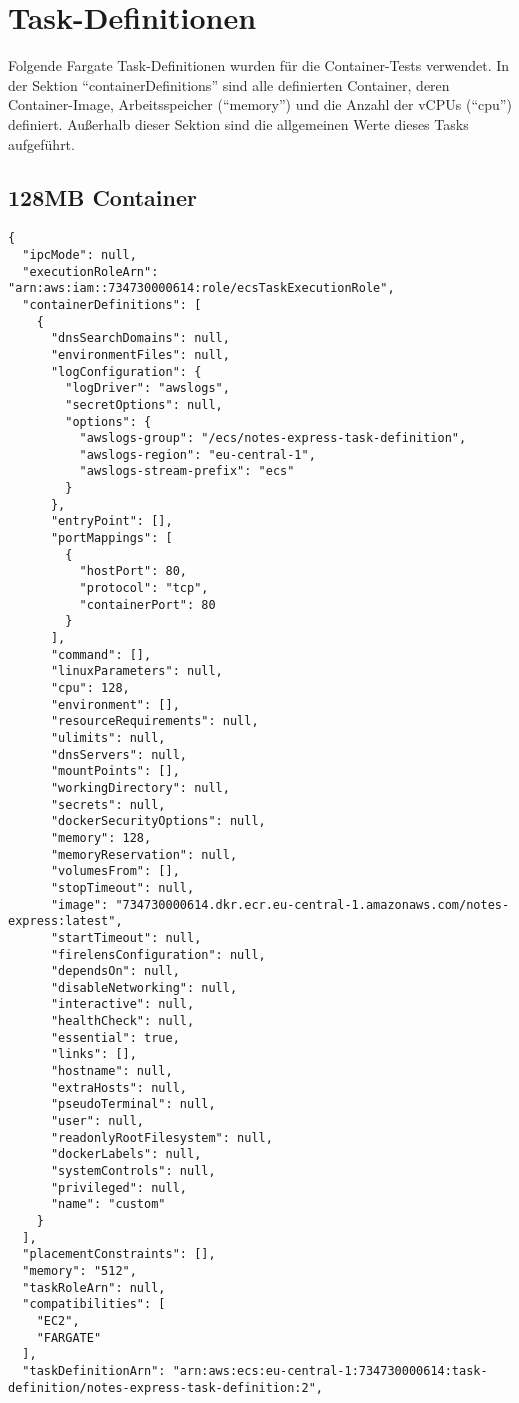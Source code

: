 \chapter{Task-Definitionen}
Folgende Fargate Task-Definitionen wurden für die Container-Tests verwendet. In der Sektion "`containerDefinitions"' sind alle definierten Container, deren Container-Image, Arbeitsspeicher ("`memory"') und die Anzahl der vCPUs ("`cpu"') definiert. Außerhalb dieser Sektion sind die allgemeinen Werte dieses Tasks aufgeführt.

\section{128MB Container}
\begin{verbatim}
{
  "ipcMode": null,
  "executionRoleArn": "arn:aws:iam::734730000614:role/ecsTaskExecutionRole",
  "containerDefinitions": [
    {
      "dnsSearchDomains": null,
      "environmentFiles": null,
      "logConfiguration": {
        "logDriver": "awslogs",
        "secretOptions": null,
        "options": {
          "awslogs-group": "/ecs/notes-express-task-definition",
          "awslogs-region": "eu-central-1",
          "awslogs-stream-prefix": "ecs"
        }
      },
      "entryPoint": [],
      "portMappings": [
        {
          "hostPort": 80,
          "protocol": "tcp",
          "containerPort": 80
        }
      ],
      "command": [],
      "linuxParameters": null,
      "cpu": 128,
      "environment": [],
      "resourceRequirements": null,
      "ulimits": null,
      "dnsServers": null,
      "mountPoints": [],
      "workingDirectory": null,
      "secrets": null,
      "dockerSecurityOptions": null,
      "memory": 128,
      "memoryReservation": null,
      "volumesFrom": [],
      "stopTimeout": null,
      "image": "734730000614.dkr.ecr.eu-central-1.amazonaws.com/notes-express:latest",
      "startTimeout": null,
      "firelensConfiguration": null,
      "dependsOn": null,
      "disableNetworking": null,
      "interactive": null,
      "healthCheck": null,
      "essential": true,
      "links": [],
      "hostname": null,
      "extraHosts": null,
      "pseudoTerminal": null,
      "user": null,
      "readonlyRootFilesystem": null,
      "dockerLabels": null,
      "systemControls": null,
      "privileged": null,
      "name": "custom"
    }
  ],
  "placementConstraints": [],
  "memory": "512",
  "taskRoleArn": null,
  "compatibilities": [
    "EC2",
    "FARGATE"
  ],
  "taskDefinitionArn": "arn:aws:ecs:eu-central-1:734730000614:task-definition/notes-express-task-definition:2",

\end{verbatim}
